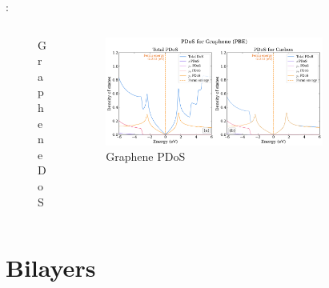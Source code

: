 \documentclass[xcolor=dvipsnames]{beamer}
\begin{document}
\begin{frame}{\insertsection: \insertsubsection}
\begin{columns}
\begin{column}{0.45\textwidth}
\begin{figure}
        \caption{Graphene DoS}
    \end{figure}\end{column}
    \begin{column}{0.55\textwidth}\begin{figure}
        \includegraphics[width=0.8\textwidth]{PDoS/Graphene_pdos.png}
        \caption{Graphene PDoS}
    \end{figure}\end{column}
\end{columns}
\end{frame}

\section{Bilayers}
\end{document}
